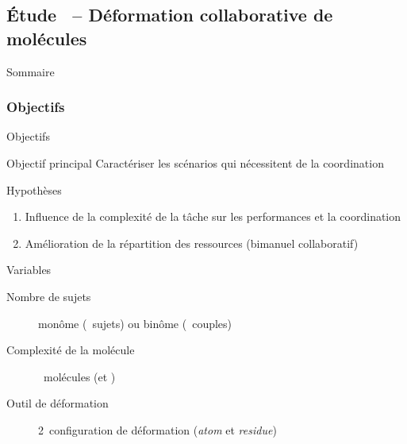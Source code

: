 \documentclass[english,french,dvips,10pt]{mybeamer}
\begin{document}
	\subsection{Étude~ -- Déformation collaborative de molécules}
	\begin{myframe}{Sommaire}
		\tableofcontents[sectionstyle=show/shaded,subsectionstyle=show/shaded/hide,subsubsectionstyle=show/show/hide]
	\end{myframe}
	\subsubsection{Objectifs}
	\begin{myframe}{Objectifs}
		\begin{myblock}{Objectif principal}
			Caractériser les scénarios qui nécessitent de la coordination
		\end{myblock}
		\begin{myplusblock}{Hypothèses}
			\begin{enumerate}
				\item Influence de la complexité de la tâche sur les performances et la coordination
				\item Amélioration de la répartition des ressources (bimanuel \myvs collaboratif)
			\end{enumerate}
		\end{myplusblock}
		\begin{myblock}{Variables}
			\begin{description}
				\item[Nombre de sujets] monôme (~sujets) ou binôme (~couples)
				\item[Complexité de la molécule] ~molécules (\myTRPZIPPER et \myTRPCAGE)
				\item[Outil de déformation] 2~configuration de déformation (\emph{atom} et \emph{residue})
			\end{description}
		\end{myblock}
	\end{myframe}
\end{document}
